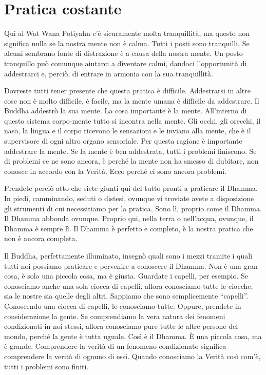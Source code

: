 \chapter{Pratica costante}

Qui al Wat Wana Potiyahn c'è sicuramente molta tranquillità, ma questo
non significa nulla se la nostra mente non è calma. Tutti i posti sono
tranquilli. Se alcuni sembrano fonte di distrazione è a causa della
nostra mente. Un posto tranquillo può comunque aiutarci a diventare
calmi, dandoci l'opportunità di addestrarci e, perciò, di entrare in
armonia con la sua tranquillità.

Dovreste tutti tener presente che questa pratica è difficile.
Addestrarsi in altre cose non è molto difficile, è facile, ma la mente
umana è difficile da addestrare. Il Buddha addestrò la sua mente. La
cosa importante è la mente. All'interno di questo sistema corpo-mente
tutto si incontra nella mente. Gli occhi, gli orecchi, il naso, la
lingua e il corpo ricevono le sensazioni e le inviano alla mente, che è
il supervisore di ogni altro organo sensoriale. Per questa ragione è
importante addestrare la mente. Se la mente è ben addestrata, tutti i
problemi finiscono. Se di problemi ce ne sono ancora, è perché la mente
non ha smesso di dubitare, non conosce in accordo con la Verità. Ecco
perché ci sono ancora problemi.

Prendete perciò atto che siete giunti qui del tutto pronti a praticare
il Dhamma. In piedi, camminando, seduti o distesi, ovunque vi troviate
avete a disposizione gli strumenti di cui necessitiamo per la pratica.
Sono lì, proprio come il Dhamma. Il Dhamma abbonda ovunque. Proprio qui,
nella terra o nell'acqua, ovunque, il Dhamma è sempre lì. Il Dhamma è
perfetto e completo, è la nostra pratica che non è ancora completa.

Il Buddha, perfettamente illuminato, insegnò quali sono i mezzi tramite
i quali tutti noi possiamo praticare e pervenire a conoscere il Dhamma.
Non è una gran cosa, è solo una piccola cosa, ma è giusta. Guardate i
capelli, per esempio. Se conosciamo anche una sola ciocca di capelli,
allora conosciamo tutte le ciocche, sia le nostre sia quelle degli
altri. Sappiamo che sono semplicemente ``capelli''. Conoscendo una
ciocca di capelli, le conosciamo tutte. Oppure, prendete in
considerazione la gente. Se comprendiamo la vera natura dei fenomeni
condizionati in noi stessi, allora conosciamo pure tutte le altre
persone del mondo, perché la gente è tutta uguale. Così è il Dhamma. È
una piccola cosa, ma è grande. Comprendere la verità di un fenomeno
condizionato significa comprendere la verità di ognuno di essi. Quando
conosciamo la Verità così com'è, tutti i problemi sono finiti.

